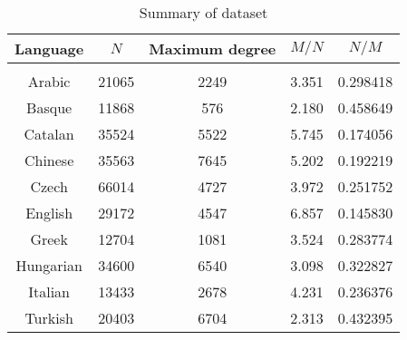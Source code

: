 \begin{table}[!htb]
\centering
\begin{tabular}{c c c c c}
Language & $N$ & Maximum degree & $M/N$ & $N/M$ \\ 
\hline  \\ 
Arabic & 21065 & 2249 & 3.351 & 0.298418 \\ 
Basque & 11868 & 576 & 2.180 & 0.458649 \\ 
Catalan & 35524 & 5522 & 5.745 & 0.174056 \\ 
Chinese & 35563 & 7645 & 5.202 & 0.192219 \\ 
Czech & 66014 & 4727 & 3.972 & 0.251752 \\ 
English & 29172 & 4547 & 6.857 & 0.145830 \\ 
Greek & 12704 & 1081 & 3.524 & 0.283774 \\ 
Hungarian & 34600 & 6540 & 3.098 & 0.322827 \\ 
Italian & 13433 & 2678 & 4.231 & 0.236376 \\ 
Turkish & 20403 & 6704 & 2.313 & 0.432395 \\ 
\end{tabular}
\caption{Summary of dataset}\label{tab:data}
\end{table}